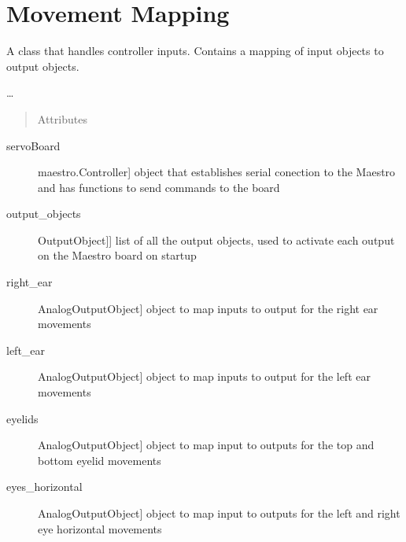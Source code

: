 \documentclass[letterpaper,10pt,english]{sphinxmanual}
\begin{document}
\chapter{Movement Mapping}
\label{\detokenize{mapping:module-MovementMap}}\label{\detokenize{mapping:movement-mapping}}\label{\detokenize{mapping::doc}}

\begin{fulllineitems}
\label{\detokenize{mapping:MovementMap.MovementMap}}
\sphinxAtStartPar
A class that handles controller inputs. Contains a mapping of input objects to output objects.

\sphinxAtStartPar
…
\begin{quote}\begin{description}
\item[{Attributes}] \leavevmode
\end{description}\end{quote}
\begin{description}
\item[{servoBoard}] \leavevmode{[}maestro.Controller{]}
\sphinxAtStartPar
object that establishes serial conection to the Maestro and has functions to send commands to the board

\item[{output\_objects}] \leavevmode{[}{[}OutputObject{]}{]}
\sphinxAtStartPar
list of all the output objects, used to activate each output on the Maestro board on startup

\item[{right\_ear}] \leavevmode{[}AnalogOutputObject{]}
\sphinxAtStartPar
object to map inputs to output for the right ear movements

\item[{left\_ear}] \leavevmode{[}AnalogOutputObject{]}
\sphinxAtStartPar
object to map inputs to output for the left ear movements

\item[{eyelids}] \leavevmode{[}AnalogOutputObject{]}
\sphinxAtStartPar
object to map input to outputs for the top and bottom eyelid movements

\item[{eyes\_horizontal}] \leavevmode{[}AnalogOutputObject{]}
\sphinxAtStartPar
object to map input to outputs for the left and right eye horizontal movements


\end{description}
\end{fulllineitems}
\end{document}
